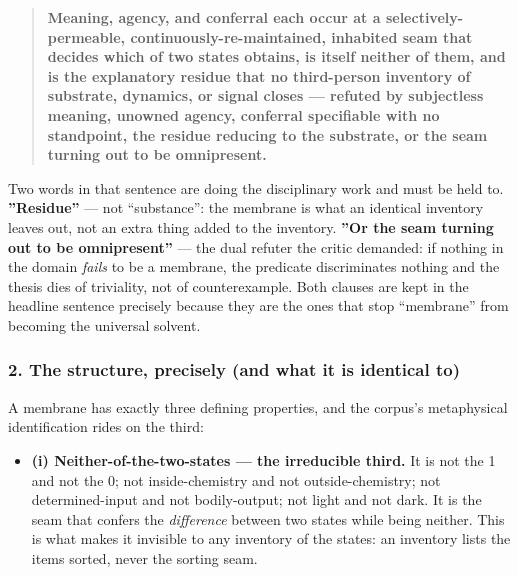 \documentclass[11pt]{article}
\begin{document}
\begin{quote}
\textbf{Meaning, agency, and conferral each occur at a selectively-permeable, continuously-re-maintained, inhabited seam that decides which of two states obtains, is itself neither of them, and is the explanatory residue that no third-person inventory of substrate, dynamics, or signal closes — refuted by subjectless meaning, unowned agency, conferral specifiable with no standpoint, the residue reducing to the substrate, or the seam turning out to be omnipresent.}
\end{quote}

Two words in that sentence are doing the disciplinary work and must be held to. \textbf{''Residue''} — not ``substance'': the membrane is what an identical inventory leaves out, not an extra thing added to the inventory. \textbf{''Or the seam turning out to be omnipresent''} — the dual refuter the critic demanded: if nothing in the domain \emph{fails} to be a membrane, the predicate discriminates nothing and the thesis dies of triviality, not of counterexample. Both clauses are kept in the headline sentence precisely because they are the ones that stop ``membrane'' from becoming the universal solvent.

\subsubsection*{2. The structure, precisely (and what it is identical to)}

A membrane has exactly three defining properties, and the corpus's metaphysical identification rides on the third:

\begin{itemize}
\item \textbf{(i) Neither-of-the-two-states — the irreducible third.} It is not the 1 and not the 0; not inside-chemistry and not outside-chemistry; not determined-input and not bodily-output; not light and not dark. It is the seam that confers the \emph{difference} between two states while being neither. This is what makes it invisible to any inventory of the states: an inventory lists the items sorted, never the sorting seam.
\end{itemize}
\end{document}
